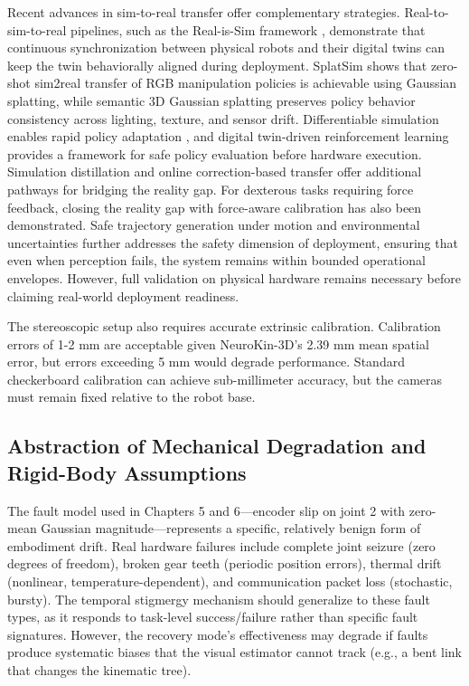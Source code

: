 \documentclass[12pt,a4paper,oneside]{report}
\begin{document}
Recent advances in sim-to-real transfer offer complementary strategies. Real-to-sim-to-real pipelines, such as the Real-is-Sim framework \cite{torne2024rialto}, demonstrate that continuous synchronization between physical robots and their digital twins can keep the twin behaviorally aligned during deployment. SplatSim \cite{qureshi2025splatsim} shows that zero-shot sim2real transfer of RGB manipulation policies is achievable using Gaussian splatting, while semantic 3D Gaussian splatting \cite{tang2025semantic} preserves policy behavior consistency across lighting, texture, and sensor drift. Differentiable simulation enables rapid policy adaptation \cite{pan2025learningfly}, and digital twin-driven reinforcement learning \cite{xu2025twinrl} provides a framework for safe policy evaluation before hardware execution. Simulation distillation \cite{levy2024simdist} and online correction-based transfer \cite{jiang2024transic} offer additional pathways for bridging the reality gap. For dexterous tasks requiring force feedback, closing the reality gap with force-aware calibration \cite{bytedance2025closing} has also been demonstrated. Safe trajectory generation under motion and environmental uncertainties \cite{meng2026riskbounded} further addresses the safety dimension of deployment, ensuring that even when perception fails, the system remains within bounded operational envelopes. However, full validation on physical hardware remains necessary before claiming real-world deployment readiness.

The stereoscopic setup also requires accurate extrinsic calibration. Calibration errors of 1-2 mm are acceptable given NeuroKin-3D's 2.39 mm mean spatial error, but errors exceeding 5 mm would degrade performance. Standard checkerboard calibration can achieve sub-millimeter accuracy, but the cameras must remain fixed relative to the robot base.

\subsection{Abstraction of Mechanical Degradation and Rigid-Body Assumptions}
\label{subsec:abstraction_of_mechanical_degradation_and_rigid_body_assumptions}

The fault model used in Chapters 5 and 6—encoder slip on joint 2 with zero-mean Gaussian magnitude—represents a specific, relatively benign form of embodiment drift. Real hardware failures include complete joint seizure (zero degrees of freedom), broken gear teeth (periodic position errors), thermal drift (nonlinear, temperature-dependent), and communication packet loss (stochastic, bursty). The temporal stigmergy mechanism should generalize to these fault types, as it responds to task-level success/failure rather than specific fault signatures. However, the recovery mode's effectiveness may degrade if faults produce systematic biases that the visual estimator cannot track (e.g., a bent link that changes the kinematic tree).
\end{document}
